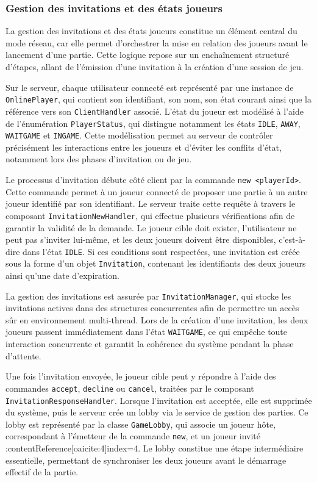 \documentclass[a4paper]{article}
\begin{document}
\subsubsection{Gestion des invitations et des états joueurs}

La gestion des invitations et des états joueurs constitue un élément central du mode réseau, car elle permet d’orchestrer la mise en relation des joueurs avant le lancement d’une partie. Cette logique repose sur un enchaînement structuré d’étapes, allant de l’émission d’une invitation à la création d’une session de jeu.

Sur le serveur, chaque utilisateur connecté est représenté par une instance de \texttt{OnlinePlayer}, qui contient son identifiant, son nom, son état courant ainsi que la référence vers son \texttt{ClientHandler} associé. L’état du joueur est modélisé à l’aide de l’énumération \texttt{PlayerStatus}, qui distingue notamment les états \texttt{IDLE}, \texttt{AWAY}, \texttt{WAITGAME} et \texttt{INGAME}. Cette modélisation permet au serveur de contrôler précisément les interactions entre les joueurs et d’éviter les conflits d’état, notamment lors des phases d’invitation ou de jeu.

Le processus d’invitation débute côté client par la commande \texttt{new <playerId>}. Cette commande permet à un joueur connecté de proposer une partie à un autre joueur identifié par son identifiant. Le serveur traite cette requête à travers le composant \texttt{InvitationNewHandler}, qui effectue plusieurs vérifications afin de garantir la validité de la demande. Le joueur cible doit exister, l’utilisateur ne peut pas s’inviter lui-même, et les deux joueurs doivent être disponibles, c’est-à-dire dans l’état \texttt{IDLE}. Si ces conditions sont respectées, une invitation est créée sous la forme d’un objet \texttt{Invitation}, contenant les identifiants des deux joueurs ainsi qu’une date d’expiration.

La gestion des invitations est assurée par \texttt{InvitationManager}, qui stocke les invitations actives dans des structures concurrentes afin de permettre un accès sûr en environnement multi-thread. Lors de la création d’une invitation, les deux joueurs passent immédiatement dans l’état \texttt{WAITGAME}, ce qui empêche toute interaction concurrente et garantit la cohérence du système pendant la phase d’attente.

Une fois l’invitation envoyée, le joueur cible peut y répondre à l’aide des commandes \texttt{accept}, \texttt{decline} ou \texttt{cancel}, traitées par le composant \texttt{InvitationResponseHandler}. Lorsque l’invitation est acceptée, elle est supprimée du système, puis le serveur crée un lobby via le service de gestion des parties. Ce lobby est représenté par la classe \texttt{GameLobby}, qui associe un joueur hôte, correspondant à l’émetteur de la commande \texttt{new}, et un joueur invité :contentReference[oaicite:4]{index=4}. Le lobby constitue une étape intermédiaire essentielle, permettant de synchroniser les deux joueurs avant le démarrage effectif de la partie.
\end{document}
